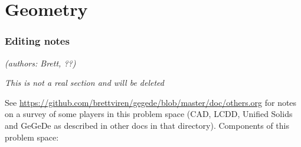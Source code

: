 \section{Geometry}
\subsubsection{Editing notes}

\textit{(authors: Brett, ??)}

\textit{This is not a real section and will be deleted}


See
\url{https://github.com/brettviren/gegede/blob/master/doc/others.org}
for notes on a survey of some players in this problem space (CAD,
LCDD, Unified Solids and GeGeDe as described in other docs in that
directory).  Components of this problem space:

